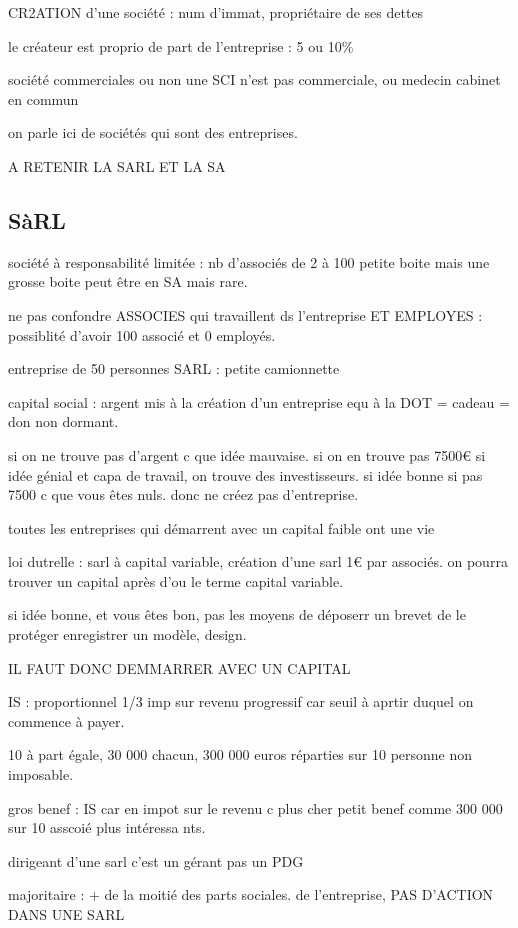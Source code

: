 \documentclass[a4paper,12pt]{article}
\begin{document}
CR2ATION d'une société : num d'immat, propriétaire de ses dettes 

le créateur est proprio de part de l'entreprise : 5 ou 10\%


société commerciales ou non une SCI n'est pas commerciale, ou medecin cabinet en commun

on parle ici de sociétés qui sont des entreprises.


A RETENIR LA SARL ET LA SA

\subsection{SàRL}
société à responsabilité limitée : nb d'associés  de 2 à 100
petite boite mais une grosse boite peut être en SA mais rare.

ne pas confondre ASSOCIES qui travaillent ds l'entreprise ET  EMPLOYES :
possiblité d'avoir 100 associé et 0 employés.

entreprise de 50 personnes SARL : petite camionnette

capital social : argent mis à la création d'un entreprise equ à la DOT = cadeau = don
non dormant.

 
si on ne trouve pas d'argent c que idée mauvaise. si on en trouve pas 7500€
si idée génial et capa de travail, on trouve des investisseurs.
si idée bonne si pas 7500 c que vous êtes nuls.
donc ne créez pas d'entreprise.

toutes les entreprises qui démarrent avec un capital faible ont une vie

loi dutrelle : sarl à capital variable, création d'une sarl 1€ par associés.
on pourra trouver un capital après d'ou le terme capital variable.


si idée bonne, et vous êtes bon, pas les moyens de déposerr un brevet de le protéger
enregistrer un modèle, design.

IL FAUT DONC DEMMARRER AVEC UN CAPITAL

IS : proportionnel 1/3
imp sur revenu progressif car seuil à aprtir duquel on commence à payer.

10 à part égale, 30 000 chacun, 300 000 euros réparties sur 10 personne non imposable.

gros benef : IS car en impot sur le revenu c plus cher
petit benef comme 300 000 sur 10 asscoié plus intéressa	nts.

dirigeant d'une sarl c'est un gérant pas un PDG

majoritaire : + de la moitié des parts sociales. de l'entreprise, PAS D'ACTION DANS UNE SARL
\end{document}

